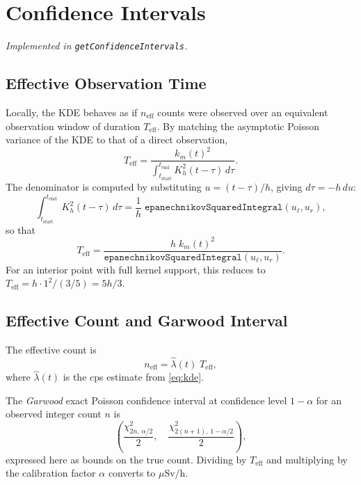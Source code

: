 \documentclass[11pt,a4paper]{article}
\newcommand{\h}{h}                   %
\newcommand{\km}{k_m}                %
\newcommand{\teff}{T_{\mathrm{eff}}} %
\newcommand{\neff}{n_{\mathrm{eff}}} %
\begin{document}
\section{Confidence Intervals}
\label{sec:ci}

\noindent\textit{Implemented in \texttt{getConfidenceIntervals}.}

\subsection{Effective Observation Time}

Locally, the KDE behaves as if $\neff$ counts were observed over an
equivalent observation window of duration $\teff$.  By matching the
asymptotic Poisson variance of the KDE to that of a direct observation,
\begin{equation}
  \teff = \frac{\km(t)^2}{\displaystyle\int_{t_{\mathrm{start}}}^{t_{\mathrm{end}}}
             K_\h^2(t-\tau)\,d\tau}.
  \label{eq:teff}
\end{equation}
The denominator is computed by substituting $u=(t-\tau)/\h$, giving
$d\tau = -\h\,du$:
\begin{equation}
  \int_{t_{\mathrm{start}}}^{t_{\mathrm{end}}} K_\h^2(t-\tau)\,d\tau
  = \frac{1}{\h}\;\texttt{epanechnikovSquaredIntegral}(u_\ell, u_r),
\end{equation}
so that
\begin{equation}
  \teff = \frac{\h\;\km(t)^2}{\texttt{epanechnikovSquaredIntegral}(u_\ell, u_r)}.
  \label{eq:teffCode}
\end{equation}
For an interior point with full kernel support, this reduces to
$\teff = \h \cdot 1^2 / (3/5) = 5\h/3$.

\subsection{Effective Count and Garwood Interval}

The effective count is
\begin{equation}
  \neff = \hat\lambda(t)\;\teff,
  \label{eq:neff}
\end{equation}
where $\hat\lambda(t)$ is the cps estimate from \eqref{eq:kde}.

The \emph{Garwood} exact Poisson confidence interval at confidence level
$1-\alpha$ for an observed integer count $n$ is
\begin{equation}
  \left(\frac{\chi^2_{2n,\,\alpha/2}}{2},\quad
        \frac{\chi^2_{2(n+1),\,1-\alpha/2}}{2}\right),
\end{equation}
expressed here as bounds on the true count.  Dividing by $\teff$ and
multiplying by the calibration factor $\alpha$ converts to $\mu\mathrm{Sv/h}$.
\end{document}
